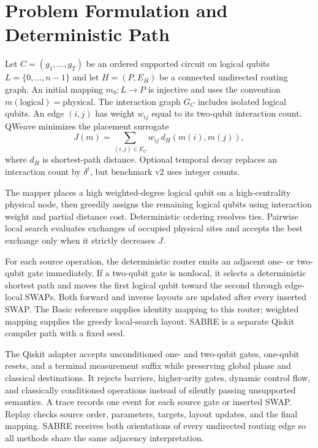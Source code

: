 \documentclass[a4paper,11pt,twocolumn]{article}
\begin{document}
\section{Problem Formulation and Deterministic Path}
Let $C=(g_1,\ldots,g_T)$ be an ordered supported circuit on logical qubits
$L=\{0,\ldots,n-1\}$ and let $H=(P,E_H)$ be a connected undirected routing
graph. An initial mapping $m_0:L\rightarrow P$ is injective and uses the
convention $m(\mathrm{logical})=\mathrm{physical}$. The interaction graph
$G_C$ includes isolated logical qubits. An edge $(i,j)$ has weight $w_{ij}$
equal to its two-qubit interaction count. QWeave minimizes the placement
surrogate
\begin{equation}
 J(m)=\sum_{(i,j)\in E_C}w_{ij}\,d_H(m(i),m(j)),
 \label{eq:objective}
\end{equation}
where $d_H$ is shortest-path distance. Optional temporal decay replaces an
interaction count by $\delta^t$, but benchmark v2 uses integer counts.

The mapper places a high weighted-degree logical qubit on a high-centrality
physical node, then greedily assigns the remaining logical qubits using
interaction weight and partial distance cost. Deterministic ordering resolves
ties. Pairwise local search evaluates exchanges of occupied physical sites and
accepts the best exchange only when it strictly decreases $J$.

For each source operation, the deterministic router emits an adjacent
one- or two-qubit gate immediately. If a two-qubit gate is nonlocal, it selects
a deterministic shortest path and moves the first logical qubit toward the
second through edge-local SWAPs. Both forward and inverse layouts are updated
after every inserted SWAP. The Basic reference supplies identity mapping to
this router; weighted mapping supplies the greedy local-search layout. SABRE is
a separate Qiskit compiler path with a fixed seed.

The Qiskit adapter accepts unconditioned one- and two-qubit gates, one-qubit
resets, and a terminal measurement suffix while preserving global phase and
classical destinations. It rejects barriers, higher-arity gates, dynamic
control flow, and classically conditioned operations instead of silently
passing unsupported semantics. A trace records one event for each source gate
or inserted SWAP. Replay checks source order, parameters, targets, layout
updates, and the final mapping. SABRE receives both orientations of every
undirected routing edge so all methods share the same adjacency interpretation.
\end{document}
